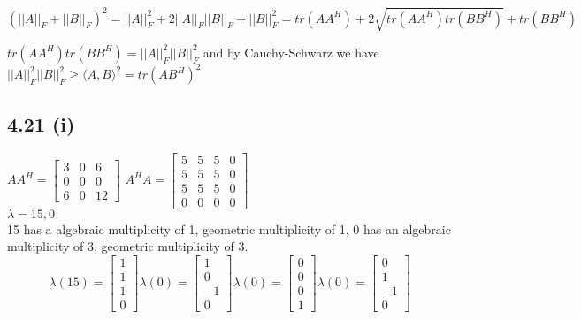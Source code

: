 \documentclass[letterpaper,12pt]{article}
\theoremstyle{definition}
\begin{document}
\[(||A||_F + ||B||_F)^2 = ||A||_F^2 +2||A||_F||B||_F + ||B||_F^2 = tr(AA^H)+ 2\sqrt{tr(AA^H)tr(BB^H)} + tr(BB^H)\]


$tr(AA^H)tr(BB^H) = ||A||_F^2||B||_F^2$ and by Cauchy-Schwarz we have\\
$ ||A||_F^2||B||_F^2 \geq \langle A,B\rangle^2 =tr(AB^H)^2$\\













\subsection*{4.21 (i)}

$AA^H = \begin{bmatrix}
    3 & 0 & 6\\
    0 & 0 & 0\\
    6 & 0 & 12
\end{bmatrix}$ $A^HA=\begin{bmatrix}
    5&5&5&0\\
    5&5&5&0\\
    5&5&5&0\\
    0&0&0&0
\end{bmatrix}$\\


        $\lambda = 15, 0$\\
        15 has a algebraic multiplicity of 1, geometric multiplicity of 1, 0 has an algebraic multiplicity of 3, geometric multiplicity of 3.
        \[ \lambda(15)= \begin{bmatrix} 1\\ 1\\ 1\\ 0 \end{bmatrix} 
        \lambda(0)= \begin{bmatrix} 1\\0\\-1\\0\end{bmatrix}
        \lambda(0) = \begin{bmatrix} 0\\0\\0\\1 \end{bmatrix}
        \lambda(0) = \begin{bmatrix} 0\\1\\-1\\0 \end{bmatrix}\]\\
\end{document}
